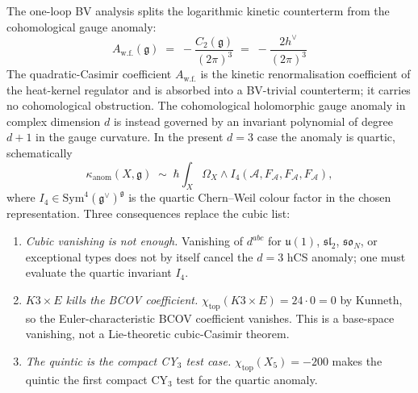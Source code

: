 \begin{theorem}
\label{thm:one-loop-anomaly-treatise}
The one-loop BV analysis splits the logarithmic kinetic counterterm from the
cohomological gauge anomaly:
\[
 A_{\mathrm{w.f.}}(\mathfrak{g}) \;=\; -\frac{C_2(\mathfrak{g})}{(2\pi)^3} \;=\; -\frac{2 h^\vee}{(2\pi)^3}
\]
The quadratic-Casimir coefficient $A_{\mathrm{w.f.}}$ is the
kinetic renormalisation coefficient of the heat-kernel regulator
and is absorbed into a BV-trivial counterterm; it carries no
cohomological obstruction.  The cohomological holomorphic gauge anomaly
in complex dimension $d$ is instead governed by an invariant polynomial
of degree $d+1$ in the gauge curvature.  In the present $d=3$ case the
anomaly is quartic, schematically
\[
\kappa_{\mathrm{anom}}(X,\mathfrak g)
\;\sim\;
\hbar\int_X \Omega_X\wedge I_4(\mathcal A,F_\mathcal A,F_\mathcal A,F_\mathcal A),
\]
where $I_4\in\mathrm{Sym}^4(\mathfrak g^\vee)^{\mathfrak g}$ is the
quartic Chern--Weil colour factor in the chosen representation.  Three
consequences replace the cubic list:
\begin{enumerate}
\item \emph{Cubic vanishing is not enough.} Vanishing of
$d^{abc}$ for $\mathfrak{u}(1)$, $\mathfrak{sl}_2$, $\mathfrak{so}_N$,
or exceptional types does not by itself cancel the $d=3$ hCS anomaly;
one must evaluate the quartic invariant $I_4$.
\item \emph{$K3\times E$ kills the BCOV coefficient.}
$\chi_{\mathrm{top}}(K3\times E)=24\cdot0=0$ by Kunneth, so the
Euler-characteristic BCOV coefficient vanishes.  This is a base-space
vanishing, not a Lie-theoretic cubic-Casimir theorem.
\item \emph{The quintic is the compact CY$_3$ test case.}
$\chi_{\mathrm{top}}(X_5)=-200$ makes the quintic the first compact
CY$_3$ test for the quartic anomaly.
\end{enumerate}
\end{theorem}

